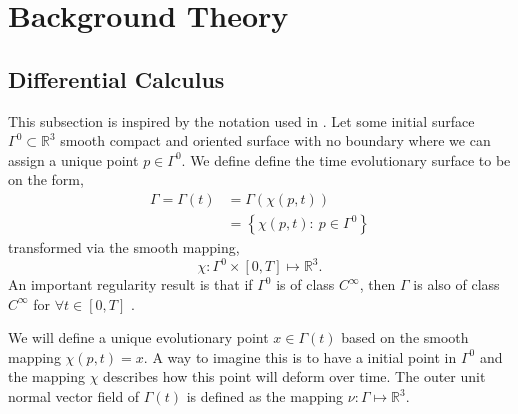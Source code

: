 

\section{Background Theory}%
\label{sec:differential_geometry}


\subsection{Differential Calculus}%
\label{sub:differential_calculus}

This subsection is inspired by the notation used in \cite{kovacs2021convergent, dougan2012first}.
Let some initial surface $\Gamma^{0} \subset \mathbb{R} ^3  $ smooth compact and oriented surface with no boundary where we can assign a unique point $p \in \Gamma ^{0}$. We define define the time evolutionary surface to be on the form,
\[
    \begin{split}
\Gamma  = \Gamma \left( t \right) & = \Gamma \left( \chi \left( p,t \right)  \right) \\
                                  &= \left\{ \chi \left( p,t \right): \ p \in \Gamma^{0}  \right\}
    \end{split}
\]
transformed via the smooth mapping,
\[
\chi : \Gamma^{0} \times  \left[ 0,T \right]  \mapsto  \mathbb{R} ^3.
\]
An important regularity result is that if $\Gamma ^{0}$ is of class $C^{\infty}$, then $\Gamma $ is also of class $C^{\infty}$ for $\forall t \in \left[ 0,T \right] $ \cite{sokolowski1992introduction, dougan2012first}.

We will define a unique evolutionary point $x \in \Gamma \left( t \right) $ based on the smooth mapping $\chi \left( p,t \right) = x$. A way to imagine this is to have a initial point in $\Gamma ^{0}$ and the mapping $\chi $ describes how this point will deform over time. The outer unit normal vector field of $\Gamma \left( t \right) $ is defined as the mapping $\nu : \Gamma \mapsto
\mathbb{R} ^{3}$.

